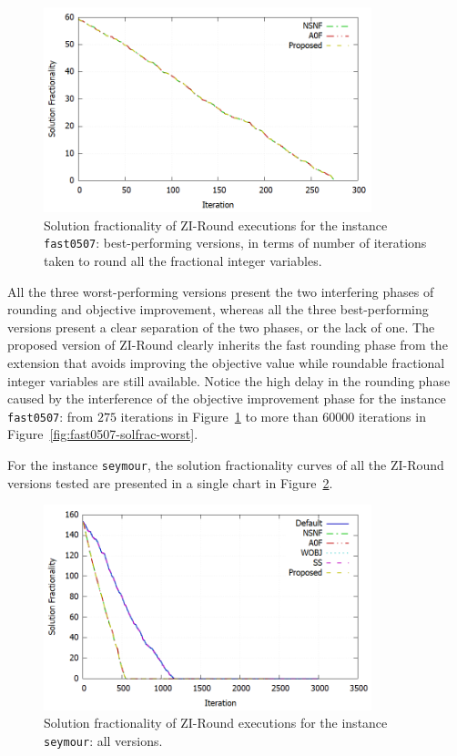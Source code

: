 \documentclass[a4paper,12pt]{book}
\begin{document}
\begin{figure}[h!]
	\centering
	\includegraphics[width=0.85\textwidth]{fast0507-solfrac-best.png}
	\caption{Solution fractionality of ZI-Round executions for the instance \texttt{fast0507}: best-performing versions, in terms of number of iterations taken to round all the fractional integer variables.}
	\label{fig:fast0507-solfrac-best}
\end{figure}

All the three worst-performing versions present the two interfering phases of rounding and objective improvement, whereas all the three best-performing versions present a clear separation of the two phases, or the lack of one. The proposed version of ZI-Round clearly inherits the fast rounding phase from the extension that avoids improving the objective value while roundable fractional integer variables are still available. Notice the high delay in the rounding phase caused by the interference of the objective improvement phase for the instance \texttt{fast0507}: from $275$ iterations in Figure~\ref{fig:fast0507-solfrac-best} to more than $60000$ iterations in Figure~\ref{fig:fast0507-solfrac-worst}. \par
 
For the instance \texttt{seymour}, the solution fractionality curves of all the ZI-Round versions tested are presented in a single chart in Figure~\ref{fig:seymour-solfrac-all}.

\begin{figure}[ht]
	\centering
	\includegraphics[width=0.85\textwidth]{seymour-solfrac-all.png}
	\caption{Solution fractionality of ZI-Round executions for the instance \texttt{seymour}: all versions.}
	\label{fig:seymour-solfrac-all}
\end{figure}
\end{document}
